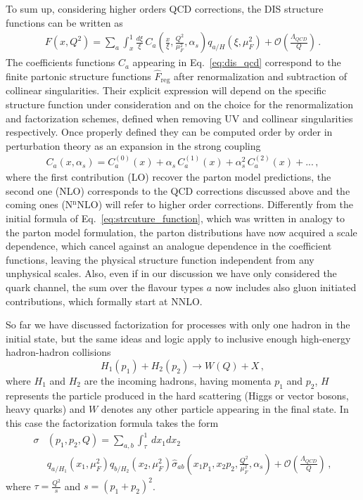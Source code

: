 %
To sum up, considering higher orders QCD corrections, the DIS structure functions can be written
as
\begin{align}
    \label{eq:dis_qcd}
    F\left(x,Q^2\right) = 
    \sum_a \int_x^1\frac{d\xi}{\xi}\,C_a\left(\frac{x}{\xi},\frac{Q^2}{\mu_F^2}, \alpha_s\right)q_{a/H}\left(\xi,\mu_F^2\right)
    +\mathcal{O}\left(\frac{\Lambda_{QCD}}{Q}\right)\,.
\end{align}
The coefficients functions $C_a$ appearing in Eq.~\eqref{eq:dis_qcd} correspond to the finite partonic structure 
functions $\hat{F}_{\text{reg}}$ after renormalization and subtraction of collinear singularities.
Their explicit expression will depend on the specific structure function under consideration
and on the choice for the renormalization and factorization schemes, defined when removing UV and collinear
singularities respectively. 
Once properly defined they can be computed order by order in perturbation theory as an expansion in the strong coupling
\begin{align}
    \label{eq:coeff_functions_expansion}
    C_a\left(x, \alpha_s\right) = C_a^{(0)}\left(x\right) + \alpha_s\, C_a^{(1)}\left(x\right) 
    + \alpha_s^2\, C_a^{(2)}\left(x\right) + ...\,,
\end{align}
where the first contribution (LO) recover the parton model predictions, the second one (NLO) corresponds to the QCD
corrections discussed above and the coming ones (N$^{\text{n}}$NLO) will refer to higher order corrections.
Differently from the initial formula of Eq.~\eqref{eq:strcuture_function}, which was written in analogy to
the parton model formulation, the parton distributions
have now acquired a scale dependence, which cancel against an analogue dependence in the coefficient functions,
leaving the physical structure function independent from any unphysical scales. Also, even if in our 
discussion we have only considered the quark channel, the sum over the flavour types $a$ now includes
also gluon initiated contributions, which formally start at NNLO.

%
So far we have discussed factorization for processes with only one hadron in the initial state, but
the same ideas and logic apply to inclusive enough high-energy hadron-hadron collisions
$$
H_1\left(p_1\right) + H_2\left(p_2\right) \rightarrow W\left(Q\right) + X\,,
$$
where $H_1$ and $H_2$ are the incoming hadrons, having momenta $p_1$ and $p_2$, $H$ represents
the particle produced in the hard scattering (Higgs or vector bosons, heavy quarks) and $W$
denotes any other particle appearing in the final state. In this case the factorization formula takes the form
\begin{align}
    \label{eq:hadron_hadron}
    \sigma&\left(p_1,p_2,Q\right) = \sum_{a,b}\int_{\tau}^1\, 
    dx_1 dx_2 \, \nonumber \\ 
    &q_{a/H_1}\left(x_1,\mu_F^2\right)q_{b/H_2}\left(x_2,\mu_F^2\right)
    \hat{\sigma}_{ab}\left(x_1p_1,x_2p_2,\frac{Q^2}{\mu_F^2},\alpha_s\right) 
    + \mathcal{O}\left(\frac{\Lambda_{QCD}}{Q}\right)\,,
\end{align}
where $\tau = \frac{Q^2}{s}$ and $s=\left(p_1+p_2\right)^2$.


